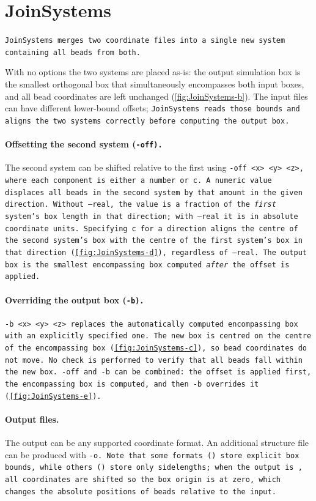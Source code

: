 \section{JoinSystems} \label{sec:JoinSystems}



\tt{JoinSystems} merges two coordinate files into a single new system containing
all beads from both.

With no options the two systems are placed as-is: the output simulation box is
the smallest orthogonal box that simultaneously encompasses both input boxes,
and all bead coordinates are left unchanged (\cref{fig:JoinSystems-b}). The
input files can have different lower-bound offsets; \tt{JoinSystems} reads those
bounds and aligns the two systems correctly before computing the output box.

\paragraph{Offsetting the second system (\tt{-off}).}
The second system can be shifted relative to the first using
\tt{-off <x> <y> <z>}, where each component is either a number or \tt{c}.
A numeric value displaces all beads in the second system by that amount in the
given direction. Without \tt{--real}, the value is a fraction of the
\emph{first} system's box length in that direction; with \tt{--real} it is in
absolute coordinate units. Specifying \tt{c} for a direction aligns the centre
of the second system's box with the centre of the first system's box in that
direction (\cref{fig:JoinSystems-d}), regardless of \tt{--real}. The output
box is the smallest encompassing box computed \emph{after} the offset is applied.

\paragraph{Overriding the output box (\tt{-b}).}
\tt{-b <x> <y> <z>} replaces the automatically computed encompassing box with
an explicitly specified one. The new box is centred on the centre of the
encompassing box (\cref{fig:JoinSystems-c}), so bead coordinates do not move.
No check is performed to verify that all beads fall within the new box.
\tt{-off} and \tt{-b} can be combined: the offset is applied first, the
encompassing box is computed, and then \tt{-b} overrides it
(\cref{fig:JoinSystems-e}).

\paragraph{Output files.}
The output can be any supported coordinate format. An additional structure file
can be produced with \tt{-o}. Note that some formats (\ltrj) store explicit
box bounds, while others (\vtf) store only sidelengths; when the output is
\vtf, all coordinates are shifted so the box origin is at zero, which changes
the absolute positions of beads relative to the input.

